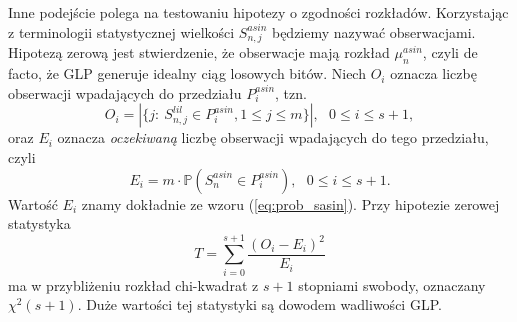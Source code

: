 \documentclass[a4paper,11pt,oneside]{book}
\newcommand{\Pro}[1]{\mathbb{P}\left(#1\right)}
\newcommand{\Slil}[1]{S^{lil}_#1}
\newcommand{\Sasin}[1]{S^{asin}_#1}
\theoremstyle{definition}
\begin{document}
Inne podejście polega na testowaniu hipotezy o zgodności rozkładów. Korzystając z terminologii statystycznej wielkości $\Sasin{{n,j}}$ będziemy nazywać obserwacjami. Hipotezą zerową jest stwierdzenie, że obserwacje mają rozkład $\mu^{asin}_n$, czyli de facto, że GLP generuje idealny ciąg losowych bitów. Niech $O_i$ oznacza liczbę obserwacji wpadających do przedziału $P^{asin}_i$, tzn.
\begin{equation}
 O_i = |\{ j:\ \Slil{{n,j}} \in  P^{asin}_i, 1 \leq j \leq m\}|,\ \ \ 0 \leq i \leq s+1,
\end{equation}
oraz $E_i$ oznacza \textit{oczekiwaną} liczbę obserwacji wpadających do tego przedziału, czyli
\begin{equation}
 E_i = m \cdot \Pro{\Sasin{n} \in P^{asin}_i},\ \ \ 0 \leq i \leq s+1.
\end{equation}
Wartość $E_i$ znamy dokładnie ze wzoru (\ref{eq:prob_sasin}). Przy hipotezie zerowej statystyka
\begin{equation}
 T = \sum_{i=0}^{s+1} \frac{(O_i - E_i)^2}{E_i}
\end{equation}
ma w przybliżeniu rozkład chi-kwadrat z $s+1$ stopniami swobody, oznaczany $\chi^2(s+1)$. Duże wartości tej statystyki są dowodem wadliwości GLP.
\end{document}

